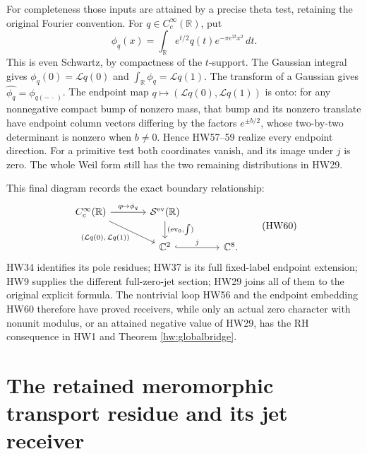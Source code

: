 \documentclass[11pt,a4paper]{article}
\theoremstyle{definition}\newtheorem{definition}[theorem]{Definition}
\newcommand{\C}{\mathbb C}\newcommand{\R}{\mathbb R}
\begin{document}
For completeness those inputs are attained by a precise
theta test, retaining the original Fourier convention.
For \(q\in C_c^\infty(\R)\), put
\[
 \phi_q(x)=\int_\R e^{t/2}q(t)e^{-\pi e^{2t}x^2}\,dt .
 \tag{HW59}
\]
This is even Schwartz, by compactness of the \(t\)-support.
The Gaussian integral gives
\(\phi_q(0)=\mathcal Lq(0)\) and
\(\int_\R\phi_q=\mathcal Lq(1)\).
The transform of a Gaussian gives
\(\widehat{\phi_q}=\phi_{q(-\,\cdot\,)}\).
The endpoint map \(q\mapsto(\mathcal Lq(0),\mathcal Lq(1))\)
is onto: for any nonnegative compact bump of nonzero mass,
that bump and its nonzero translate have endpoint column
vectors differing by the factors \(e^{\pm b/2}\), whose
two-by-two determinant is nonzero when \(b\ne0\).
Hence HW57--59 realize every endpoint direction.
For a primitive test both coordinates vanish, and its
image under \(j\) is zero. The whole Weil form still has
the two remaining distributions in HW29.

This final diagram records the exact boundary relationship:
\[
 \begin{tikzcd}[column sep=large]
 C_c^\infty(\R) \arrow[r,"q\mapsto\phi_q"]
          \arrow[dr,"{(\mathcal Lq(0),\,\mathcal Lq(1))}"']
  &\mathcal S^{\rm ev}(\R)\arrow[d,"{(\mathrm{ev}_0,\int)}"]\\
  &\C^2\arrow[r,hook,"j"]&\C^8 .
 \end{tikzcd}
 \tag{HW60}
\]
HW34 identifies its pole residues; HW37 is its full
fixed-label endpoint extension; HW9 supplies the different
full-zero-jet section; HW29 joins all of them to the
original explicit formula. The nontrivial loop HW56 and
the endpoint embedding HW60 therefore have proved
receivers, while only an actual zero character with
nonunit modulus, or an attained negative value of HW29,
has the RH consequence in HW1 and Theorem
\ref{hw:globalbridge}.

\section{The retained meromorphic transport residue and its jet receiver}
\end{document}
